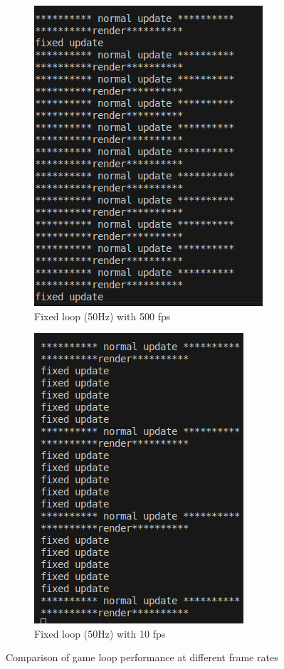 \documentclass{projdoc}
\begin{document}
\begin{figure}[h]
    \centering
    \begin{subfigure}[b]{0.45\textwidth}
        \centering
        \includegraphics[scale=0.5]{img/gameloop-console.png}
        \caption{Fixed loop (50Hz) with 500 fps}
        \label{fig:poc-gameloop-500fps}
    \end{subfigure}
    \hfill
    \begin{subfigure}[b]{0.45\textwidth}
        \centering
        \includegraphics[scale=0.5]{img/gameloop-console-10.png}
        \caption{Fixed loop (50Hz) with 10 fps}
        \label{fig:poc-gameloop-10fps}
    \end{subfigure}
    \caption{Comparison of game loop performance at different frame rates}
    \label{fig:poc-gameloop-console-comparison}
\end{figure}
\end{document}
